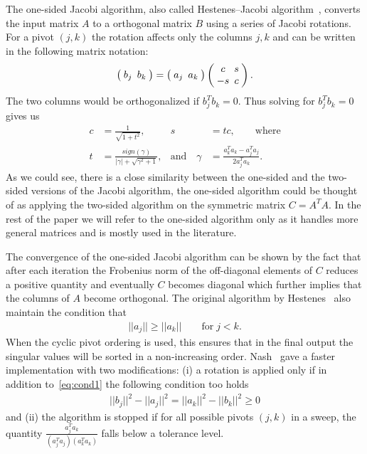 \documentclass[10pt, conference, compsocconf]{IEEEtran}
\begin{document}
The one-sided Jacobi algorithm, also called Hestenes–Jacobi algorithm~\cite{hestenes1958inversion}, converts the input matrix $A$ to a orthogonal matrix $B$ using a series of Jacobi rotations. For a pivot $(j,k)$ the rotation affects only the columns $j,k$ and can be written in the following matrix notation:
\begin{align}
\setlength{\arraycolsep}{2.5pt}
  \left(\begin{array}{cc}
    b_{j} & b_{k} 
  \end{array} \right)
  =
  \left(\begin{array}{cc}
    a_{j} & a_{k} 
  \end{array} \right)
  \left(\begin{array}{cc}
    c & s \\
    -s & c
  \end{array} \right).
\end{align}
The two columns would be orthogonalized if $b_j^T b_k = 0$. Thus solving for $b_{j}^T b_{k} = 0$ gives us 
\begin{align}
  c &= \frac{1}{\sqrt{1+t^2}}, & s&=tc, \qquad \text{where} \nonumber \\
  t &= \frac{sign(\gamma)}{|\gamma|+\sqrt{\gamma^2+1}}, & \text{and} \quad \gamma &= \frac{a_k^T a_k - a_j^T a_j}{2a_j^Ta_k}.
  \label{eq:onesided}
\end{align}
As we could see, there is a close similarity between the one-sided and the two-sided versions of the Jacobi algorithm, the one-sided algorithm could be thought of as applying the two-sided algorithm on the symmetric matrix $C = A^TA$. In the rest of the paper we will refer to the one-sided algorithm only as it handles more general matrices and is mostly used in the literature.

The convergence of the one-sided Jacobi algorithm can be shown by the fact that after each iteration the Frobenius norm of the off-diagonal elements of $C$ reduces a positive quantity and eventually $C$ becomes diagonal which further implies that the columns of $A$ become orthogonal. The original algorithm by Hestenes~\cite{hestenes1958inversion} also maintain the condition that 
\begin{align}
  ||a_j|| \ge ||a_k|| \qquad \text{for} \; j<k. \label{eq:cond1}
\end{align}
When the cyclic pivot ordering is used, this ensures that in the final output the singular values will be sorted in a non-increasing order. Nash~\cite{nash1975one} gave a faster implementation with two modifications: (i) a rotation is applied only if in addition to~\eqref{eq:cond1} the following condition too holds
\begin{align}
  ||b_j||^2 - ||a_j||^2 = ||a_k||^2 - ||b_k||^2 \ge 0 \label{eq:cond2}
\end{align}
and (ii) the algorithm is stopped if for all possible pivots $(j,k)$ in a sweep, the quantity $\frac{a_j^Ta_k}{(a_j^Ta_j)(a_k^Ta_k)}$ falls below a tolerance level.
\end{document}

